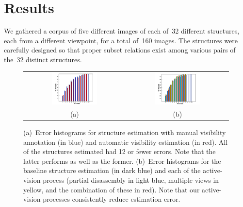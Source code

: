 \section{Results}
\label{sec:results}

We gathered a corpus of five different images of each of~32 different structures,
each from a different viewpoint, for a total of~160 images.
%
The structures were carefully designed so that proper subset relations exist
among various pairs of the~32 distinct structures.

\begin{figure}
  \centering
  \begin{tabular}{@{}cc@{}}
    \includegraphics[width=0.47\textwidth]{images/visibility}&
    \includegraphics[width=0.47\textwidth]{images/active-vision}\\[-0.5ex]
    (a)&(b)
  \end{tabular}
  \par\vspace*{-2ex}
  \caption{(a)~Error histograms for structure estimation with manual visibility
    annotation (in blue) and automatic visibility estimation (in red).
    All of the structures estimated had 12 or fewer errors.
    Note that the latter performs as well as the former.
    (b)~Error histograms for the baseline structure estimation (in dark blue)
    and each of the active-vision process (partial disassembly in light blue,
    multiple views in yellow, and the combination of these in red).
    Note that our active-vision processes consistently reduce estimation
    error.}
  \label{fig:visibility}
  \par\vspace*{-2ex}
\end{figure}

